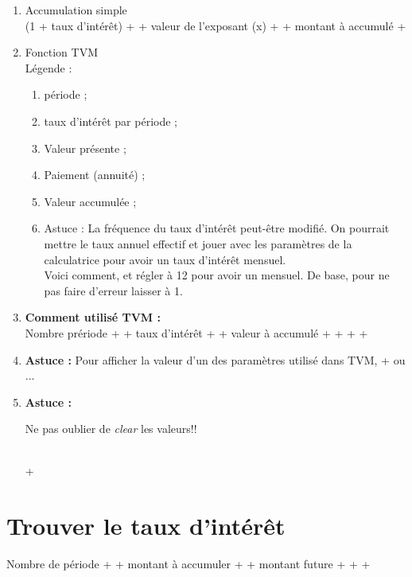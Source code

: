 \documentclass[11pt,french]{report}
\begin{document}
\begin{enumerate}

\item Accumulation simple
\\ (1 + taux d'intérêt) +  + valeur de l'exposant (x) +  + montant à accumulé + \fbox{=}
\item Fonction TVM
\\ Légende :

\begin{enumerate}
\item {} période ;
\item {} taux d'intérêt par période ;
\item {} Valeur présente ;
\item {} Paiement (annuité) ;
\item {} Valeur accumulée ;
\item Astuce : La fréquence du taux d'intérêt peut-être modifié. On pourrait mettre le taux annuel effectif et jouer avec les paramètres de la calculatrice pour avoir un taux d'intérêt mensuel.
\\ Voici comment,  et régler à 12 pour avoir un mensuel. De base, pour ne pas faire d'erreur laisser à 1.
\end{enumerate}

\item \textbf{Comment utilisé TVM :}
\\ Nombre prériode +  + taux d'intérêt +  + valeur à accumulé + \fbox{+|-} +  +  + 
\item \textbf{Astuce :} Pour afficher la valeur d'un des paramètres utilisé dans TVM,  +  ou ... 
\item \textbf{Astuce :}
\begin{LARGE}
Ne pas oublier de \textit{clear} les valeurs!!
\end{LARGE}
\\  + 

\end{enumerate}

\section{Trouver le taux d'intérêt}
\label{sec:sioler i}

Nombre de période +  + montant à accumuler +  + montant future +  +  + 
\end{document}
